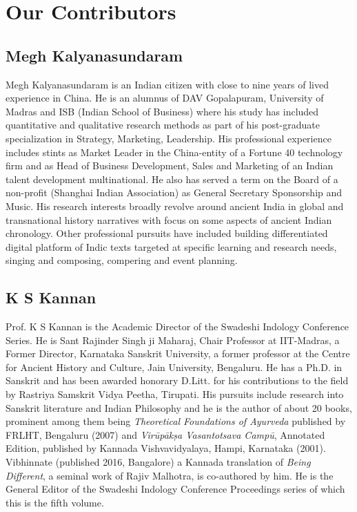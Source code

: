 
\chapter*{Our Contributors }\label{contributors}

\vspace{-1cm}

\section*{Megh Kalyanasundaram}

Megh Kalyanasundaram is an Indian citizen with close to nine years of lived experience in China. He is an alumnus of DAV Gopalapuram, University of Madras and ISB (Indian School of Business) where his study has included quantitative and qualitative research methods as part of his post-graduate specialization in Strategy, Marketing, Leadership. His professional experience includes stints as Market Leader in the China-entity of a Fortune 40 technology firm and as Head of Business Development, Sales and Marketing of an Indian talent development multinational. He also has served a term on the Board of a non-profit (Shanghai Indian Association) as General Secretary Sponsorship and Music. His research interests broadly revolve around ancient India in global and transnational history narratives with focus on some aspects of ancient Indian chronology. Other professional pursuits have included building differentiated digital platform of Indic texts targeted at specific learning and research needs, singing and composing, compering and event planning.

\vspace{-.3cm}

\section*{K S Kannan}

Prof. K S Kannan is the Academic Director of the Swadeshi Indology Conference Series. He is Sant Rajinder Singh ji Maharaj, Chair Professor at IIT-Madras, a Former Director, Karnataka Sanskrit University, a former professor at the Centre for Ancient History and Culture, Jain University, Bengaluru. He has a Ph.D. in Sanskrit and has been awarded honorary D.Litt. for his contributions to the field by Rastriya Samskrit Vidya Peetha, Tirupati. His pursuits include research into Sanskrit literature and Indian Philosophy and he is the author of about 20 books, prominent among them being \textit{Theoretical Foundations of Ayurveda} published by FRLHT, Bengaluru (2007) and \textit{Virūpākṣa Vasantotsava Campū}, Annotated Edition, published by Kannada Vishvavidyalaya, Hampi, Karnataka (2001). Vibhinnate (published 2016, Bangalore) a Kannada translation of \textit{Being Different}, a seminal work of Rajiv Malhotra, is co-authored by him. He is the General Editor of the Swadeshi Indology Conference Proceedings series of which this is the fifth volume.

